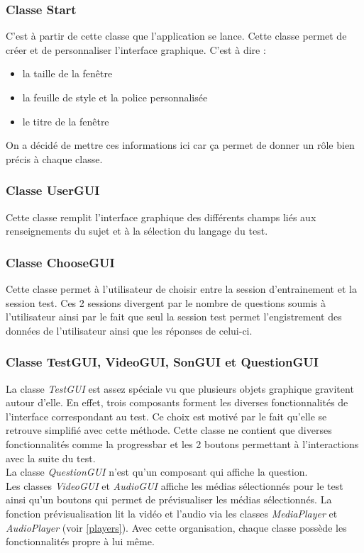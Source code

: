 \subsubsection{Classe Start}

C'est à partir de cette classe que l'application se lance.
Cette classe permet de créer et de personnaliser l'interface graphique. C'est à dire :
\begin{itemize}
 \item la taille de la fenêtre
 \item la feuille de style et la police personnalisée
 \item le titre de la fenêtre
\end{itemize}
On a décidé de mettre ces informations ici car ça permet de donner un rôle bien précis à chaque classe.

\subsubsection{Classe UserGUI}

Cette classe remplit l'interface graphique des différents champs liés aux renseignements du sujet et à la sélection du langage du test. 

\subsubsection{Classe ChooseGUI}

Cette classe permet à l'utilisateur de choisir entre la session d'entrainement et la session test. Ces 2 sessions divergent par le nombre de questions soumis à l'utilisateur ainsi par le fait que seul la session test permet l'engistrement des données de l'utilisateur ainsi que les réponses de celui-ci.

\subsubsection{Classe TestGUI, VideoGUI, SonGUI et QuestionGUI}

La classe \textit{TestGUI} est assez spéciale vu que plusieurs objets graphique gravitent autour d'elle. En effet, trois composants forment les diverses fonctionnalités de l'interface correspondant au test. Ce choix est motivé par le fait qu'elle se retrouve simplifié avec cette méthode. Cette classe ne contient que diverses fonctionnalités comme la progressbar et les 2 boutons permettant à l'interactions avec la suite du test.\\
La classe \textit{QuestionGUI} n'est qu'un composant qui affiche la question.\\
Les classes \textit{VideoGUI} et \textit{AudioGUI} affiche les médias sélectionnés pour le test ainsi qu'un boutons qui permet de prévisualiser les médias sélectionnés. La fonction prévisualisation lit la vidéo et l'audio via les classes \textit{MediaPlayer} et \textit{AudioPlayer} (voir \ref{players}).
Avec cette organisation, chaque classe possède les fonctionnalités propre à lui même.

